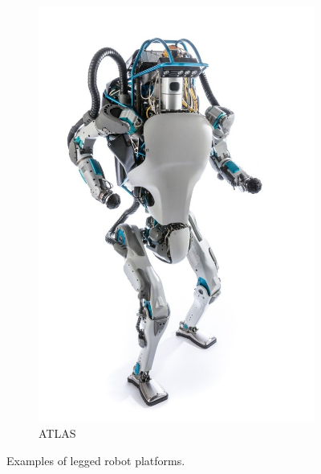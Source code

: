\begin{figure}[htb]
    \begin{subfigure}[t]{0.32\textwidth}
        \includegraphics[width=\textwidth]{figures/biped_atlas.jpg}
        \caption{ATLAS}
        \label{fig:atlas}
    \end{subfigure}
    \caption{Examples of legged robot platforms.}
    \label{fig:biped_robots}
\end{figure}







